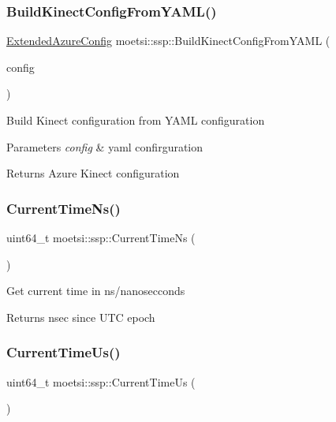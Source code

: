 \subsubsection{\texorpdfstring{Build\+Kinect\+Config\+From\+Y\+A\+M\+L()}{BuildKinectConfigFromYAML()}}
{\footnotesize\ttfamily \hyperlink{structmoetsi_1_1ssp_1_1ExtendedAzureConfig}{Extended\+Azure\+Config} moetsi\+::ssp\+::\+Build\+Kinect\+Config\+From\+Y\+A\+ML (\begin{DoxyParamCaption}\item[{Y\+A\+M\+L\+::\+Node}]{config }\end{DoxyParamCaption})}

Build Kinect configuration from Y\+A\+ML configuration 
\begin{DoxyParams}{Parameters}
{\em config} & yaml confirguration \\
\hline
\end{DoxyParams}
\begin{DoxyReturn}{Returns}
Azure Kinect configuration 
\end{DoxyReturn}
\mbox{\label{namespacemoetsi_1_1ssp_ae09a8f6b1d89b0bdb6eec602dd581192}} 
\subsubsection{\texorpdfstring{Current\+Time\+Ns()}{CurrentTimeNs()}}
{\footnotesize\ttfamily uint64\+\_\+t moetsi\+::ssp\+::\+Current\+Time\+Ns (\begin{DoxyParamCaption}{ }\end{DoxyParamCaption})}

Get current time in ns/nanosecconds \begin{DoxyReturn}{Returns}
nsec since U\+TC epoch 
\end{DoxyReturn}
\mbox{\label{namespacemoetsi_1_1ssp_ad7107897c233642c927f0129f2aea2e0}} 
\subsubsection{\texorpdfstring{Current\+Time\+Us()}{CurrentTimeUs()}}
{\footnotesize\ttfamily uint64\+\_\+t moetsi\+::ssp\+::\+Current\+Time\+Us (\begin{DoxyParamCaption}{ }\end{DoxyParamCaption})}

